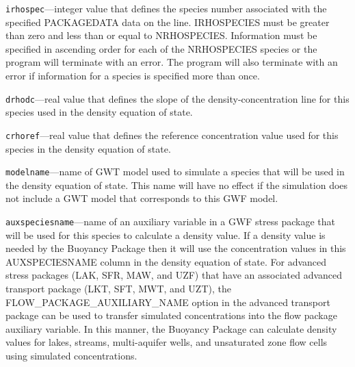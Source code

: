 \begin{description}
\item \texttt{irhospec}---integer value that defines the species number associated with the specified PACKAGEDATA data on the line. IRHOSPECIES must be greater than zero and less than or equal to NRHOSPECIES. Information must be specified in ascending order for each of the NRHOSPECIES species or the program will terminate with an error.  The program will also terminate with an error if information for a species is specified more than once.

\item \texttt{drhodc}---real value that defines the slope of the density-concentration line for this species used in the density equation of state.

\item \texttt{crhoref}---real value that defines the reference concentration value used for this species in the density equation of state.

\item \texttt{modelname}---name of GWT model used to simulate a species that will be used in the density equation of state.  This name will have no effect if the simulation does not include a GWT model that corresponds to this GWF model.

\item \texttt{auxspeciesname}---name of an auxiliary variable in a GWF stress package that will be used for this species to calculate a density value.  If a density value is needed by the Buoyancy Package then it will use the concentration values in this AUXSPECIESNAME column in the density equation of state.  For advanced stress packages (LAK, SFR, MAW, and UZF) that have an associated advanced transport package (LKT, SFT, MWT, and UZT), the FLOW\_PACKAGE\_AUXILIARY\_NAME option in the advanced transport package can be used to transfer simulated concentrations into the flow package auxiliary variable.  In this manner, the Buoyancy Package can calculate density values for lakes, streams, multi-aquifer wells, and unsaturated zone flow cells using simulated concentrations.

\end{description}


